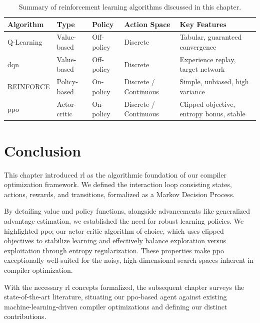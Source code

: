 \begin{table}[H]
    \centering
    \caption{Summary of reinforcement learning algorithms discussed in this chapter.}
    \label{tab:rl-algorithms}
    \vspace{0.2cm}
    \begin{tabularx}{\textwidth}{l l l l >{\raggedright\arraybackslash}p{4cm}}
        \toprule
        \textbf{Algorithm} & \textbf{Type} & \textbf{Policy} & \textbf{Action Space} & \textbf{Key Features} \\
        \midrule
        Q-Learning & Value-based & Off-policy & Discrete & Tabular, guaranteed convergence \\
        \addlinespace
        \gls{dqn} & Value-based & Off-policy & Discrete & Experience replay, target network \\
        \addlinespace
        REINFORCE & Policy-based & On-policy & Discrete / Continuous & Simple, unbiased, high variance \\
        \addlinespace
        \gls{ppo} & Actor-critic & On-policy & Discrete / Continuous & Clipped objective, entropy bonus, stable \\
        \bottomrule
    \end{tabularx}
\end{table}

\section{Conclusion}

This chapter introduced \gls{rl} as the algorithmic foundation of our compiler optimization framework. We defined the interaction loop consisting states, actions, rewards, and transitions, formalized as a Markov Decision Process. 

By detailing value and policy functions, alongside advancements like generalized advantage estimation, we established the need for robust learning policies. We highlighted \gls{ppo}; our actor-critic algorithm of choice, which uses clipped objectives to stabilize learning and effectively balance exploration versus exploitation through entropy regularization. These properties make \gls{ppo} exceptionally well-suited for the noisy, high-dimensional search spaces inherent in compiler optimization.

With the necessary \gls{rl} concepts formalized, the subsequent chapter surveys the state-of-the-art literature, situating our \gls{ppo}-based agent against existing machine-learning-driven compiler optimizations and defining our distinct contributions.